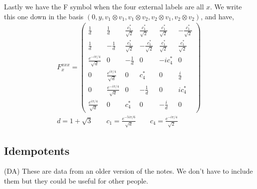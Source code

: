 \documentclass[12pt,a4paper]{article}
\newcommand{\tp}{\otimes}
\newcommand{\dave}[1]{{\color{ao(english)}\footnotesize{(DA) #1}}}
\begin{document}
Lastly we have the F symbol when the four external labels are all $x$.
We write this one down in the basis $(0,y, v_1\tp v_1,v_1 \tp v_2, v_2 \tp v_1, v_2 \tp v_2)$, and have,
\begin{align}
F^{xxx}_x  = 
 \left(\begin{matrix}
\frac{1}{d} & \frac{1}{d} & \frac{c_1^*}{\sqrt{2}} & \frac{c_1^*}{\sqrt{2}} & \frac{c_1^*}{\sqrt{2}} & - \frac{c_1^*}{\sqrt{2}} \\
\frac{1}{d} & - \frac{1}{d} & \frac{c_1^*}{\sqrt{2}} & -\frac{c_1^*}{\sqrt{2}} & \frac{c_1^*}{\sqrt{2}} & \frac{c_1^*}{\sqrt{2}} \\
\frac{e^{- i \pi/4}}{\sqrt{d}} & 0 & -\frac{1}{d} & 0 & -i c_4^* & 0 \\
0 & \frac{e^{i \pi /4}}{\sqrt{d}} & 0 &c_4^* & 0 & \frac{ i}{d} \\
0 & \frac{e^{- i \pi /4}}{\sqrt{d}} & 0 & -\frac{1}{d} & 0 & i c_4^* \\ 
\frac{e^{i \pi /4}}{\sqrt{d}} & 0 & c_4^* & 0 & - \frac{i}{d} & 0
\end{matrix} \right) \\
d = 1 + \sqrt{3} \quad \quad c_1 = \frac{e^{-5 i \pi/6} }{\sqrt{d}} \quad \quad c_4 = \frac{e^{-i \pi/4}}{\sqrt{2}}
\end{align}

\newpage
\subsection{Idempotents}
\dave{These are data from an older version of the notes. We don't have to include them but they could be useful for other people. }
\end{document}
